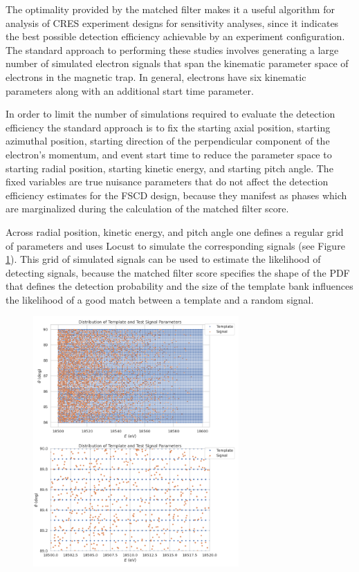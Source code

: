 The optimality provided by the matched filter makes it a useful algorithm for analysis of CRES experiment designs for sensitivity analyses, since it indicates the best possible detection efficiency achievable by an experiment configuration. The standard approach to performing these studies involves generating a large number of simulated electron signals that span the kinematic parameter space of electrons in the magnetic trap. In general, electrons have six kinematic parameters along with an additional start time parameter. 

In order to limit the number of simulations required to evaluate the detection efficiency the standard approach is to fix the starting axial position, starting azimuthal position, starting direction of the perpendicular component of the electron's momentum, and event start time to reduce the parameter space to starting radial position, starting kinetic energy, and starting pitch angle. The fixed variables are true nuisance parameters that do not affect the detection efficiency estimates for the FSCD design, because they manifest as phases which are marginalized during the calculation of the matched filter score.

Across radial position, kinetic energy, and pitch angle one defines a regular grid of parameters and uses Locust to simulate the corresponding signals (see Figure \ref{fig:chap4-mf-parameter-grid}). This grid of simulated signals can be used to estimate the likelihood of detecting signals, because the matched filter score specifies the shape of the PDF that defines the detection probability and the size of the template bank influences the likelihood of a good match between a template and a random signal.

\begin{figure}[htbp]
    \centering
    \includegraphics*[width=0.7\textwidth]{figs/Chapter-4/230725_matched_filter_grid_example.png}
    \caption{\label{fig:chap4-mf-parameter-grid}}
\end{figure}

